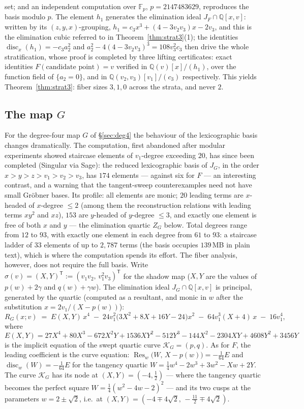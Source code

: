 \documentclass[11pt]{article}
\theoremstyle{plain}
\theoremstyle{definition}
\theoremstyle{remark}
\newcommand{\Q}{\mathbb{Q}}
\begin{document}
set; and an independent computation over $\mathbb{F}_p$, $p=2147483629$,
reproduces the basis modulo $p$. The element $h_1$ generates the elimination
ideal $J_F\cap\Q[x,v]$: written by its $(z,y,x)$-grouping,
$h_1=c_3x^3+(4-3v_2v_3)x-2v_3$, and this is the elimination cubic referred to
in Theorem~\ref{thm:strat3}(1); the identities
$\operatorname{disc}_x(h_1)=-c_3a_2^2$ and $a_2^2-4(4-3v_2v_3)^3=108v_3^2c_3$
then drive the whole stratification, whose proof is completed by three lifting
certificates: exact identities $F(\text{candidate point})=v$ verified in
$\Q(v)[x]/(h_1)$, over the function field of $\{a_2=0\}$, and in
$\Q(v_2,v_3)[v_1]/(c_3)$ respectively. This yields
Theorem~\ref{thm:strat3}: fiber sizes $3,1,0$ across the strata, and never
$2$.

\subsection{The map $G$}\label{app:G}

For the degree-four map $G$ of \S\ref{sec:deg4} the behaviour of the
lexicographic basis changes dramatically. The computation, first abandoned
after modular experiments showed staircase elements of $v_1$-degree exceeding
$20$, has since been completed (Singular via Sage): the reduced lexicographic
basis of $J_G$, in the order $x>y>z>v_1>v_2>v_3$, has $174$ elements ---
against six for $F$ --- an interesting contrast, and a warning that the
tangent-sweep counterexamples need not have small Gr\"obner bases. Its profile:
all elements are monic; $20$ leading terms are $x$-headed of $x$-degree
$\le2$ (among them the reconstruction relations with leading terms $xy^2$ and
$xz$), $153$ are $y$-headed of $y$-degree $\le3$, and exactly one element is
free of both $x$ and $y$ --- the elimination quartic $Z_G$ below. Total
degrees range from $12$ to $93$, with exactly one element in each degree from
$61$ to $93$: a staircase ladder of $33$ elements of up to $2{,}787$ terms
(the basis occupies $139$\,MB in plain text), which is where the computation
spends its effort. The fiber analysis, however, does not require the full
basis. Write
$\sigma(v)=(X,Y)^{\mathsf T}:=(v_1v_2,\,v_1^2v_3)^{\mathsf T}$ for the shadow map ($X,Y$ are the values of
$p(w)+2\gamma$ and $q(w)+\gamma w$). The elimination ideal $J_G\cap\Q[x,v]$ is
principal, generated by the quartic (computed as a resultant, and monic in $w$
after the substitution $x=2v_1/(X-p(w))$):
\[
R_G(x;v)\;=\;E(X,Y)\,x^4\;-\;24v_1^2\bigl(3X^2+8X+16Y-24\bigr)x^2
\;-\;64v_1^3(X+4)\,x\;-\;16v_1^4 ,
\]
where
\[
E(X,Y)=27X^4+80X^3-672X^2Y+1536XY^2-512Y^3-144X^2-2304XY+4608Y^2+3456Y
\]
is the implicit equation of the swept quartic curve $\mathcal{K}_G=(p,q)$. As for
$F$, the leading coefficient is the curve equation:
$\operatorname{Res}_w\bigl(W,\,X-p(w)\bigr)=-\tfrac{1}{64}E$ and
$\operatorname{disc}_w(W)=-\tfrac{1}{64}E$ for the tangency quartic
$W=\tfrac14w^4-2w^3+3w^2-Xw+2Y$. The curve $\mathcal{K}_G$ has its node at
$(X,Y)=(-4,\tfrac12)$ --- where the tangency quartic becomes the perfect square
$W=\tfrac14(w^2-4w-2)^2$ --- and its two cusps at the parameters $w=2\pm\sqrt2$,
i.e.\ at $(X,Y)=(-4\mp4\sqrt2,\,-\tfrac{11}2\mp4\sqrt2)$.
\end{document}
